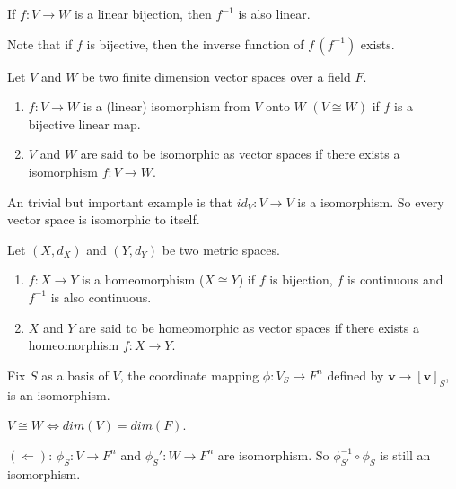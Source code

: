 \documentclass[12pt]{article}
\begin{document}
\begin{theorem}
    If $f:V\rightarrow W$ is a linear bijection, then $f^{-1}$ is also linear.
\end{theorem}
Note that if $f$ is bijective, then the inverse function of $f\, (f^{-1})$ exists.

\begin{definition}
    Let $V$ and $W$ be two finite dimension vector spaces over a field $F$.
    \begin{enumerate}
        \item $f:V\rightarrow W$ is a (linear) isomorphism from $V$ onto $W$ $(V\cong W)$ if $f$ is a bijective linear map.
        \item $V$ and $W$ are said to be isomorphic as vector spaces if there exists a isomorphism $f: V\rightarrow W$.
    \end{enumerate}
\end{definition}

An trivial but important example is that $id_V:V\rightarrow V$ is a isomorphism. So every vector space is isomorphic to itself.


\begin{gbox}
\begin{definition}[Homeomorphism]
    Let $(X,d_X)$ and $(Y,d_Y)$ be two metric spaces.
\begin{enumerate}
    \item $f:X\rightarrow Y$ is a homeomorphism ($X\cong Y$) if $f$ is bijection, $f$ is continuous and $f^{-1}$ is also continuous.
    \item $X$ and $Y$ are said to be homeomorphic as vector spaces if there exists a homeomorphism $f: X\rightarrow Y$.
\end{enumerate}
\end{definition}
\end{gbox}


\begin{theorem}
    Fix $S$ as a basis of $V$, the coordinate mapping $\phi: V_S\rightarrow F^n$ defined by $\mathbf{v}\rightarrow [\mathbf{v}]_S$, is an isomorphism.
\end{theorem}

\begin{theorem}
    $V\cong W\Leftrightarrow dim(V)=dim(F)$.
\end{theorem}

\begin{tcolorbox}[boxrule=0.5pt]
\begin{pf}
$(\Leftarrow)$: $\phi_S: V\rightarrow F^n$ and $\phi_S': W\rightarrow F^n$  are isomorphism. So $\phi^{-1}_{S'}\circ\phi_S$ is still an isomorphism.
\end{pf}    
\end{tcolorbox}
\end{document}
